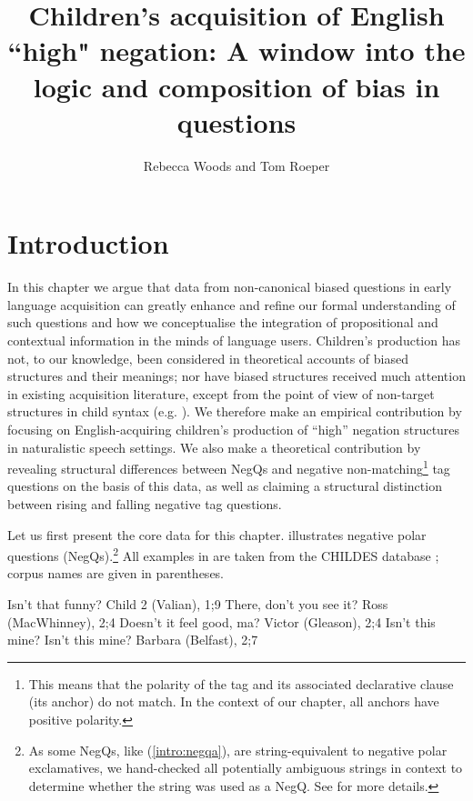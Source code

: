\documentclass[output=paper,colorlinks,citecolor=brown]{langscibook}
\author{Rebecca Woods\orcid{0000-0002-7116-9191}\affiliation{Newcastle University} and Tom Roeper\affiliation{University of Massachusetts Amherst}}
\title[Children's acquisition of English ``high" negation]{Children's acquisition of English ``high" negation: A window into the logic and composition of bias in questions}
\begin{document}
\maketitle

\section{Introduction}
In this chapter we argue that data from non-canonical biased questions in early language acquisition can greatly enhance and refine our formal understanding of such questions and how we conceptualise the integration of propositional and contextual information in the minds of language users. Children's production has not, to our knowledge, been considered in theoretical accounts of biased structures and their meanings; nor have biased structures received much attention in existing acquisition literature, except from the point of view of non-target structures in child syntax (e.g. \citealt{guastietal1995}). We therefore make an empirical contribution by focusing on English-acquiring children's production of ``high'' negation structures in naturalistic speech settings. We also make a theoretical contribution by revealing structural differences between NegQs and negative non-matching\footnote{This means that the polarity of the tag and its associated declarative clause (its anchor) do not match. In the context of our chapter, all anchors have positive polarity.} tag questions on the basis of this data, as well as claiming a structural distinction between rising and falling negative tag questions. 

Let us first present the core data for this chapter.  illustrates negative polar questions (NegQs).\footnote{As some NegQs, like (\ref{intro:negqa}), are string-equivalent to negative polar exclamatives, we hand-checked all potentially ambiguous strings in context to determine whether the string was used as a NegQ. See  for more details.} All examples in  are taken from the CHILDES database \citep{macwhin2000}; corpus names are given in parentheses.

\ea \label{intro:negqs}
	\ea Isn't that funny? \label{intro:negqa}\phantom{a} \hfill Child 2 (Valian), 1;9
	\ex There, don't you see it? \phantom{a} \hfill Ross (MacWhinney), 2;4
	\ex Doesn't it feel good, ma?\phantom{a} \hfill Victor (Gleason), 2;4 
	\ex Isn't this mine? Isn't this mine? \phantom{a} \hfill Barbara (Belfast), 2;7
 \z
\z

\end{document}
